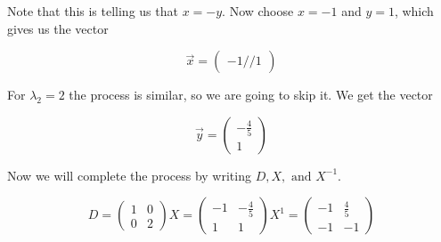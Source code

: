 Note that this is telling us that \(x = -y\). Now choose \(x = -1\) and \(y = 1\), which gives us the vector 

\[
\vec{x} = \begin{pmatrix}
    -1 // 1
\end{pmatrix}
\]

For \(\lambda_2 = 2\) the process is similar, so we are going to skip it. We get the vector

\[
\vec{y} = \begin{pmatrix}
    -\frac{4}{5} \\ 1
\end{pmatrix}
\]

Now we will complete the process by writing \(D, X, \text{ and } X^{-1}\).

\[
D = \begin{pmatrix}
    1 & 0 \\
    0 & 2
\end{pmatrix}
X = \begin{pmatrix}
    -1  & -\frac{4}{5} \\
    1   &   1 
\end{pmatrix}
X^{1} = \begin{pmatrix}
    -1  & \frac{4}{5} \\
    -1   &   -1 
\end{pmatrix}
\]






